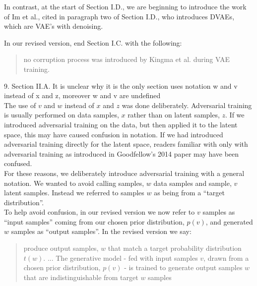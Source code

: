 \documentclass[a4paper,11pt]{article}
\begin{document}
In contrast, at the start of Section I.D., we are beginning to introduce the work of Im et al., cited in paragraph two of Section I.D., who introduces DVAEs, which are VAE's with denoising.

In our revised version, end Section I.C. with the following:
\begin{quote}
     {\color{red} no corruption process was introduced by Kingma et al. during VAE training.}
\end{quote}

{\color{blue}
9. Section II.A. It is unclear why it is the only section uses notation w and v instead of x and z, moreover w and v are undefined}\\

The use of $v$ and $w$ instead of $x$ and $z$ was done deliberately. Adversarial training is usually performed on data samples, $x$ rather than on latent samples, $z$. If we introduced adversarial training on the data, but then applied it to the latent space, this may have caused confusion in notation. If we had introduced adversarial training directly for the latent space, readers familiar with only with adversarial training as introduced in Goodfellow's 2014 paper may have been confused. \\

For these reasons, we deliberately introduce adversarial training with a general notation. We wanted to avoid calling samples, $w$ data samples and sample, $v$ latent samples. Instead we referred to samples $w$ as being from a ``target distribution''.\\

To help avoid confusion, in our revised version we now refer to $v$ samples as ``input samples'' coming from our chosen prior distribution, $p(v)$, and generated $w$ samples as ``output samples''. In the revised version we say:
    
    \begin{quote}
        {\color{red} produce output samples, $w$ that match a target probability distribution $t(w)$. \newline ... \newline
        The generative model - fed with input samples $v$, drawn from a chosen prior distribution, $p(v)$ - is trained to generate output samples $w$ that are indistinguishable from target $w$ samples }
    \end{quote}
\end{document}
